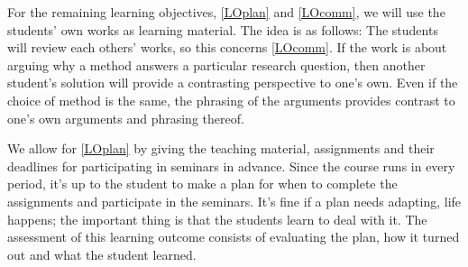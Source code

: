 For the remaining learning objectives, \ref{LOplan} and \ref{LOcomm}, we will 
use the students' own works as learning material.
The idea is as follows:
The students will review each others' works, so this concerns \ref{LOcomm}.
If the work is about arguing why a method answers a particular research 
question, then another student's solution will provide a contrasting 
perspective to one's own.
Even if the choice of method is the same, the phrasing of the arguments 
provides contrast to one's own arguments and phrasing thereof.

We allow for \ref{LOplan} by giving the teaching material, assignments and 
their deadlines for participating in seminars in advance.
Since the course runs in every period, it's up to the student to make a plan 
for when to complete the assignments and participate in the seminars.
It's fine if a plan needs adapting, life happens; the important thing is that 
the students learn to deal with it.
The assessment of this learning outcome consists of evaluating the plan, how it 
turned out and what the student learned.


